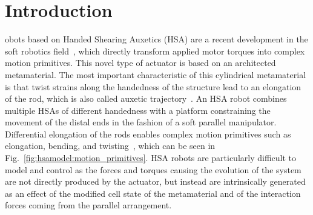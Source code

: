\section{Introduction}\label{sec:hsamodel:introduction}


obots based on Handed Shearing Auxetics (HSA) are a recent development in the soft robotics field~\citep{chin2018compliant, truby2021recipe, zhang2022vision, lipton2018handedness, chin2019automated}, which directly transform applied motor torques into complex motion primitives.
%
This novel type of actuator is based on an architected metamaterial. The most important characteristic of this cylindrical metamaterial is that twist strains along the handedness of the structure lead to an elongation of the rod, which is also called auxetic trajectory~\citep{good2022expanding}. 
An \gls{HSA} robot combines multiple \glspl{HSA} of different handedness with a platform constraining the movement of the distal ends in the fashion of a soft parallel manipulator. 
Differential elongation of the rods enables complex motion primitives such as elongation, bending, and twisting~\citep{chin2018compliant}, which can be seen in Fig.~\ref{fig:hsamodel:motion_primitives}. %
\gls{HSA} robots are particularly difficult to model and control as the forces and torques causing the evolution of the system are not directly produced by the actuator, but instead are intrinsically generated as an effect of the modified cell state of the metamaterial and of the interaction forces coming from the parallel arrangement.

